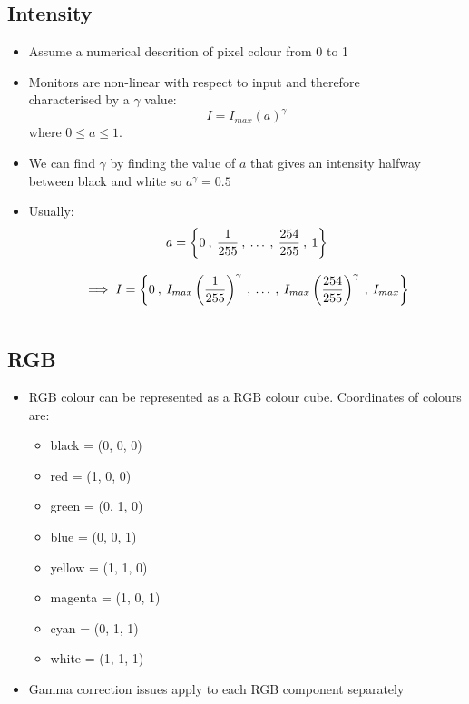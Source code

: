 \subsection{Intensity}

\begin{itemize}
  \item Assume a numerical descrition of pixel colour from 0 to 1
  \item Monitors are non-linear with respect to input and therefore \\ characterised by a $\gamma$ value:
    \begin{equation*}
      I = I_{max}(a)^{\gamma}
    \end{equation*}
      where $0 \leq a \leq 1$.
  \item We can find $\gamma$ by finding the value of $a$ that gives an intensity halfway between black and white so $a^{\gamma} = 0.5$
  \item Usually:
    \begin{gather*}
        a = \left\{ 0 \:, \: \frac{1}{255} \:,\: \ldots \:, \: \frac{254}{255} \:, \: 1 \right\} \\[2ex]
        \vspace{10pt}
        \implies I = \left\{ 0 \:, \: I_{max}\left(\frac{1}{255}\right)^{\gamma} \:,\: \ldots \:, \: I_{max}\left(\frac{254}{255}\right)^{\gamma} \:, \: I_{max} \right\}
    \end{gather*}
\end{itemize}

\subsection{RGB}

\begin{itemize}
  \item RGB colour can be represented as a RGB colour cube. Coordinates of colours are:
    \begin{itemize}
      \item black = (0, 0, 0)
      \item red = (1, 0, 0)
      \item green = (0, 1, 0)
      \item blue = (0, 0, 1)
      \item yellow = (1, 1, 0)
      \item magenta = (1, 0, 1)
      \item cyan = (0, 1, 1)
      \item white = (1, 1, 1)
    \end{itemize}
  \item Gamma correction issues apply to each RGB component separately
\end{itemize}

